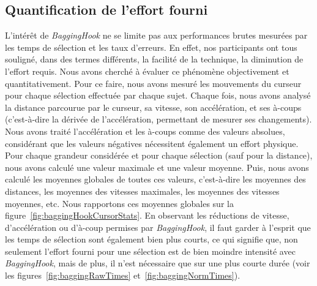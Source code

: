	\subsection{Quantification de l'effort fourni}
	L'intérêt de \emph{BaggingHook} ne se limite pas aux performances brutes mesurées par les temps de sélection et les taux d'erreurs. En effet, nos participants ont tous souligné, dans des termes différents, la \og facilité \fg{} de la technique, la diminution de l'effort requis. Nous avons cherché à évaluer ce phénomène objectivement et quantitativement. Pour ce faire, nous avons mesuré les mouvements du curseur pour chaque sélection effectuée par chaque sujet. Chaque fois, nous avons analysé la distance parcourue par le curseur, sa vitesse, son accélération, et ses à-coups (c'est-à-dire la dérivée de l'accélération, permettant de mesurer ses changements). Nous avons traité l'accélération et les à-coups comme des valeurs absolues, considérant que les valeurs négatives nécessitent également un effort physique. Pour chaque grandeur considérée et pour chaque sélection (sauf pour la distance), nous avons calculé une valeur maximale et une valeur moyenne. Puis, nous avons calculé les moyennes globales de toutes ces valeurs, c'est-à-dire les moyennes des distances, les moyennes des vitesses maximales, les moyennes des vitesses moyennes, etc. Nous rapportons ces moyennes globales sur la figure~\ref{fig:baggingHookCursorStats}. En observant les réductions de vitesse, d'accélération ou d'à-coup permises par \emph{BaggingHook}, il faut garder à l'esprit que les temps de sélection sont également bien plus courts, ce qui signifie que, non seulement l'effort fourni pour une sélection est de bien moindre intensité avec \emph{BaggingHook}, mais de plus, il n'est nécessaire que sur une plus courte durée (voir les figures~\ref{fig:baggingRawTimes} et~\ref{fig:baggingNormTimes}).


